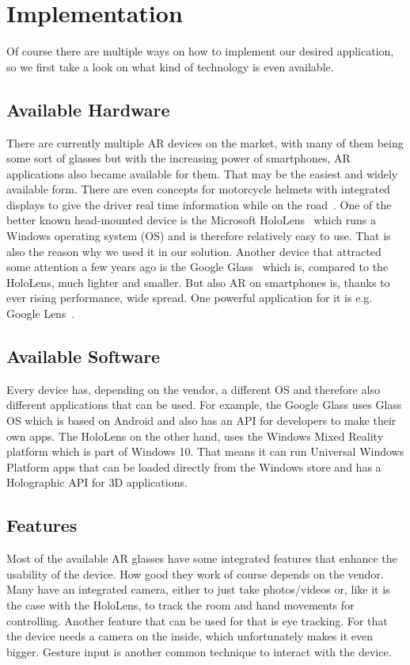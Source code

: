 \chapter{Implementation}
\label{cha:implementation}

Of course there are multiple ways on how to implement our desired application, so we first take a look on what kind of technology is even available.

\section{Available Hardware}
There are currently multiple AR devices on the market, with many of them being some sort of glasses but with the increasing power of smartphones, AR applications also became available for them. That may be the easiest and widely available form. There are even concepts for motorcycle helmets with integrated displays to give the driver real time information while on the road~\cite{jarvish}. \newline 
One of the better known head-mounted device is the Microsoft HoloLens~\cite{hololens} which runs a Windows operating system (OS) and is therefore relatively easy to use. That is also the reason why we used it in our solution. Another device that attracted some attention a few years ago is the Google Glass~\cite{googleglass} which is, compared to the HoloLens, much lighter and smaller. But also AR on smartphones is, thanks to ever rising performance, wide spread. One powerful application for it is e.g. Google Lens~\cite{googlelens}.


\section{Available Software}
Every device has, depending on the vendor, a different OS and therefore also different applications that can be used. For example, the Google Glass uses Glass OS which is based on Android and also has an API for developers to make their own apps. The HoloLens on the other hand, uses the Windows Mixed Reality platform which is part of Windows 10. That means it can run Universal Windows Platform apps that can be loaded directly from the Windows store and has a Holographic API for 3D applications.


\section{Features}
Most of the available AR glasses have some integrated features that enhance the usability of the device. How good they work of course depends on the vendor. Many have an integrated camera, either to just take photos/videos or, like it is the case with the HoloLens, to track the room and hand movements for controlling. Another feature that can be used for that is eye tracking. For that the device needs a camera on the inside, which unfortunately makes it even bigger. Gesture input is another common technique to interact with the device.


